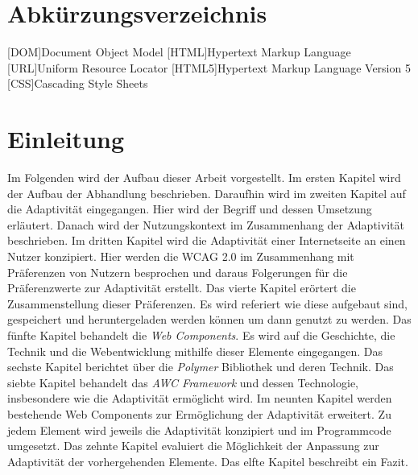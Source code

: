 \documentclass[12pt, paper=a4, bibtotoc, toc=listof, headsepline=true]{scrreprt}
\begin{document}
\chapter*{Abkürzungsverzeichnis}
\begin{acronym}
	[DOM]{Document Object Model}
	[HTML]{Hypertext Markup Language}
	[URL]{Uniform Resource Locator}
	[HTML5]{Hypertext Markup Language Version 5}
	[CSS]{Cascading Style Sheets}
\end{acronym}

\tableofcontents



\chapter{Einleitung}
Im Folgenden wird der Aufbau dieser Arbeit vorgestellt. Im ersten Kapitel wird der Aufbau der Abhandlung beschrieben. Daraufhin wird im zweiten Kapitel auf die Adaptivität eingegangen. Hier wird der Begriff und dessen Umsetzung erläutert. Danach wird der Nutzungskontext im Zusammenhang der Adaptivität beschrieben. Im dritten Kapitel wird die Adaptivität einer Internetseite an einen Nutzer konzipiert. Hier werden die \ac{WCAG 2.0} im Zusammenhang mit Präferenzen von Nutzern besprochen und daraus Folgerungen für die Präferenzwerte zur Adaptivität erstellt. Das vierte Kapitel erörtert die Zusammenstellung dieser Präferenzen. Es wird referiert wie diese aufgebaut sind, gespeichert und heruntergeladen werden können um dann genutzt zu werden. Das fünfte Kapitel behandelt die \emph{Web Components}. Es wird auf die Geschichte, die Technik und die Webentwicklung mithilfe dieser Elemente eingegangen. Das sechste Kapitel berichtet über die \emph{Polymer} Bibliothek und deren Technik. Das siebte Kapitel behandelt das \emph{AWC Framework} und dessen Technologie, insbesondere wie die Adaptivität ermöglicht wird. Im neunten Kapitel werden bestehende Web Components zur Ermöglichung der Adaptivität erweitert. Zu jedem Element wird jeweils die Adaptivität konzipiert und im Programmcode umgesetzt. Das zehnte Kapitel evaluiert die Möglichkeit der Anpassung zur Adaptivität der vorhergehenden Elemente. Das elfte Kapitel beschreibt ein Fazit. 
\end{document}
